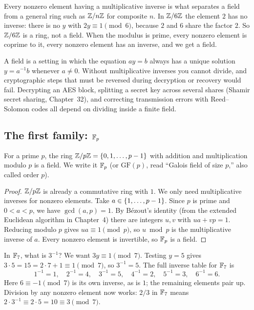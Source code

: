 Every nonzero element having a multiplicative inverse is what separates a field
from a general ring such as $\mathbb{Z}/n\mathbb{Z}$ for composite $n$. In $\mathbb{Z}/6\mathbb{Z}$ the element
$2$ has no inverse: there is no $y$ with $2y \equiv 1 \pmod 6$, because $2$ and
$6$ share the factor $2$. So $\mathbb{Z}/6\mathbb{Z}$ is a ring, not a field. When the modulus
is prime, every nonzero element is coprime to it, every nonzero element has an
inverse, and we get a field.

\begin{intuitionbox}
A field is a setting in which the equation $ay = b$ always has a unique
solution $y = a^{-1}b$ whenever $a \neq 0$. Without multiplicative inverses you
cannot divide, and cryptographic steps that must be reversed during decryption
or recovery would fail. Decrypting an AES block, splitting a secret key across
several shares (Shamir secret sharing, Chapter~32), and correcting transmission
errors with Reed--Solomon codes all depend on dividing inside a finite field.
\end{intuitionbox}

\subsection{The first family: $\mathbb{F}_p$}

\begin{theorem}
\label{ch06:thm-fp}
For a prime $p$, the ring $\mathbb{Z}/p\mathbb{Z} = \{0,1,\dots,p-1\}$ with addition and
multiplication modulo $p$ is a field. We write it $\mathbb{F}_p$ (or $\mathrm{GF}(p)$,
read ``Galois field of size $p$,'' also called order $p$).
\end{theorem}

\begin{proof}
$\mathbb{Z}/p\mathbb{Z}$ is already a commutative ring with $1$. We only need multiplicative
inverses for nonzero elements. Take $a \in \{1,\dots,p-1\}$. Since $p$ is
prime and $0 < a < p$, we have $\gcd(a,p)=1$. By B\'ezout's identity (from the
extended Euclidean algorithm in Chapter~4) there are integers $u,v$ with
$ua + vp = 1$. Reducing modulo $p$ gives $ua \equiv 1 \pmod p$, so $u \bmod p$
is the multiplicative inverse of $a$. Every nonzero element is invertible, so
$\mathbb{F}_p$ is a field.
\end{proof}

\begin{example}[Inverses in $\F_7$]
\label{ch06:ex-f7}
In $\F_7$, what is $3^{-1}$? We want $3y \equiv 1 \pmod 7$. Testing $y=5$ gives
$3\cdot 5 = 15 = 2\cdot 7 + 1 \equiv 1 \pmod 7$, so $3^{-1} = 5$. The full
inverse table for $\F_7$ is
\[
1^{-1}=1,\quad 2^{-1}=4,\quad 3^{-1}=5,\quad 4^{-1}=2,\quad 5^{-1}=3,\quad
6^{-1}=6.
\]
Here $6 \equiv -1 \pmod 7$ is its own inverse, as is $1$; the remaining
elements pair up. Division by any nonzero element now works: $2/3$ in $\F_7$
means $2 \cdot 3^{-1} \equiv 2 \cdot 5 = 10 \equiv 3 \pmod 7$.
\end{example}

